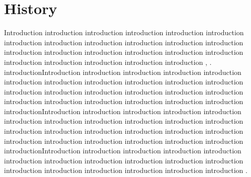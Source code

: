 \section{History}
Introduction introduction introduction introduction introduction introduction introduction introduction introduction introduction introduction introduction introduction introduction introduction introduction introduction introduction introduction introduction introduction introduction introduction \cite{ref1}, \cite{ref2}.  introductionIntroduction introduction introduction introduction introduction introduction introduction introduction introduction introduction introduction introduction introduction introduction introduction introduction introduction introduction introduction introduction introduction introduction introduction introductionIntroduction introduction introduction introduction introduction introduction introduction introduction introduction introduction introduction introduction introduction introduction introduction introduction introduction introduction introduction introduction introduction introduction introduction introductionIntroduction introduction introduction introduction introduction introduction introduction introduction introduction introduction introduction introduction introduction introduction introduction introduction introduction \cite{ref5, ref6, ref7}. 
